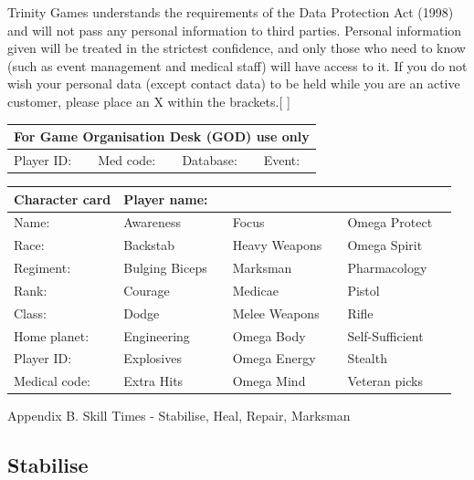 	Trinity Games understands the requirements of the Data Protection Act (1998) and will not pass any personal information to third parties. Personal information given will be treated in the strictest confidence, and only those who need to know (such as event management and medical staff) will have access to it. If you do not wish your personal data (except contact data) to be held while you are an active customer, please place an X within the brackets.{[} {]}

\begin{table}
\begin{tabular}{|l|l|l|l|} \hline 
\multicolumn{4}{|l|}{\textbf{For Game Organisation Desk (GOD) use only}} \\
 \hline Player ID: & Med code: & Database: & Event: \\
 \hline \end{tabular}

\end{table}

\begin{table}
\begin{tabular}{|l|l|l|l|l|l|l|} \hline 
\textbf{Character card} & \multicolumn{6}{|l|}{\textbf{Player name:}} \\
 \hline Name: & Awareness &  & Focus &  & Omega Protect &  \\
 \hline Race: & Backstab &  & Heavy Weapons &  & Omega Spirit &  \\
 \hline Regiment: & Bulging Biceps &  & Marksman &  & Pharmacology &  \\
 \hline Rank: & Courage &  & Medicae &  & Pistol &  \\
 \hline Class: & Dodge &  & Melee Weapons &  & Rifle &  \\
 \hline Home planet: & Engineering &  & Omega Body &  & Self-Sufficient &  \\
 \hline Player ID: & Explosives &  & Omega Energy &  & Stealth &  \\
 \hline Medical code: & Extra Hits &  & Omega Mind &  & Veteran picks &  \\
 \hline \end{tabular}

\end{table}
Appendix B. Skill Times - Stabilise, Heal, Repair, Marksman

\subsection{Stabilise}

